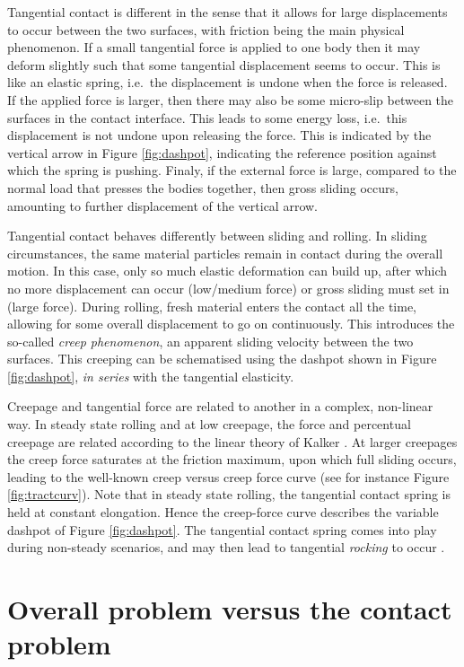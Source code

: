 \documentclass[12pt]{report}
\begin{document}
Tangential contact is different in the sense that it allows for large
displacements to occur between the two surfaces, with friction being the
main physical phenomenon. If a small tangential force is applied to one
body then it may deform slightly such that some tangential displacement seems
to occur. This is like an elastic spring, i.e.\ the displacement is undone
when the force is released. If the applied force is larger, then there may
also be some micro-slip between the surfaces in the contact interface. This
leads to some energy loss, i.e.\ this displacement is not undone upon
releasing the force. This is indicated by the vertical arrow in Figure
\ref{fig:dashpot}, indicating the reference position against which the
spring is pushing. Finaly, if the external force is large, compared to
the normal load that presses the bodies together, then gross sliding
occurs, amounting to further displacement of the vertical arrow.

Tangential contact behaves differently between sliding and rolling. In
sliding circumstances, the same material particles remain in contact during
the overall motion. In this case, only so much elastic deformation can
build up, after which no more displacement can occur (low/medium force) or
gross sliding must set in (large force). During rolling, fresh material
enters the contact all the time, allowing for some overall displacement to
go on continuously. This introduces the so-called {\em creep phenomenon\/},
an apparent sliding velocity between the two surfaces. This creeping can be
schematised using the dashpot shown in Figure \ref{fig:dashpot}, {\em in
series\/} with the tangential elasticity.

Creepage and tangential force are related to another in a complex,
non-linear way. In steady state rolling and at low creepage, the force and
percentual creepage are related according to the linear theory of Kalker
\cite{Kalker1967,Kalker1990}. At larger creepages the creep force saturates
at the friction maximum, upon which full sliding occurs, leading to the
well-known creep versus creep force curve (see for instance Figure
\ref{fig:tractcurv}). Note that in steady state rolling, the tangential
contact spring is held at constant elongation.  Hence the creep-force curve
describes the variable dashpot of Figure \ref{fig:dashpot}. The tangential
contact spring comes into play during non-steady scenarios, and may then
lead to tangential {\em rocking\/} to occur \cite{Vollebregt2015b-iavsd2015,
Vollebregt2017a-iavsd2017}.

\section{Overall problem versus the contact problem}
\end{document}
